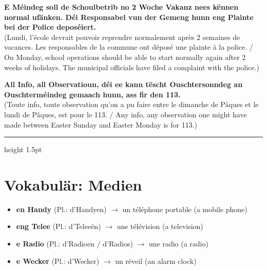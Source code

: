 \textbf{E Méindeg soll de Schoulbetrib no 2 Woche Vakanz nees kënnen normal ufänken. Déi Responsabel vun der Gemeng hunn eng Plainte bei der Police deposéiert.} \\
(Lundi, l'école devrait pouvoir reprendre normalement après 2 semaines de vacances. Les responsables de la commune ont déposé une plainte à la police. / On Monday, school operations should be able to start normally again after 2 weeks of holidays. The municipal officials have filed a complaint with the police.)

\textbf{All Info, all Observatioun, déi ee kann tëscht Ouschtersonndeg an Ouschterméindeg gemaach hunn, ass fir den 113.} \\
(Toute info, toute observation qu'on a pu faire entre le dimanche de Pâques et le lundi de Pâques, est pour le 113. / Any info, any observation one might have made between Easter Sunday and Easter Monday is for 113.)

\vspace{1.5cm}
\color{geminiBlue}\hrule height 1.5pt \vspace{0.5em}\color{black}
\section{Vokabulär: Medien}

\begin{itemize}
    \item \textbf{en Handy} (Pl.: d'Handyen) $\rightarrow$ un téléphone portable (a mobile phone)
    \item \textbf{eng Telee} (Pl.: d'Teleeën) $\rightarrow$ une télévision (a television)
    \item \textbf{e Radio} (Pl.: d'Radioen / d'Radios) $\rightarrow$ une radio (a radio)
    \item \textbf{e Wecker} (Pl.: d'Wecker) $\rightarrow$ un réveil (an alarm clock)
\end{itemize}

\vspace{1em}

